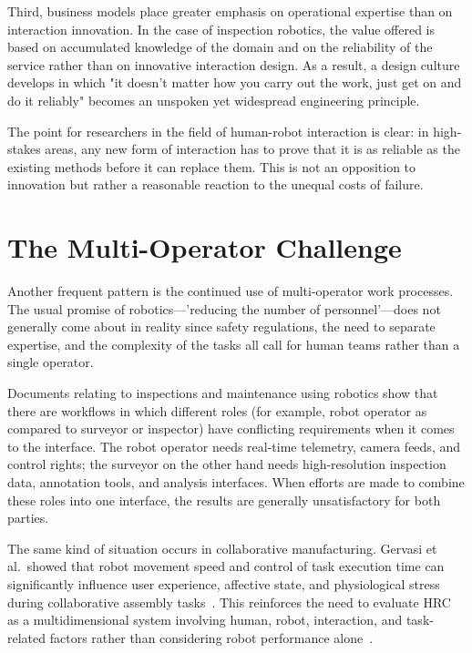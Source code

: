 \documentclass[sigconf, nonacm] {acmart}
\begin{document}
Third, business models place greater emphasis on operational expertise than on interaction innovation. In the case of inspection robotics, the value offered is based on accumulated knowledge of the domain and on the reliability of the service rather than on innovative interaction design. As a result, a design culture develops in which "it doesn't matter how you carry out the work, just get on and do it reliably" becomes an unspoken yet widespread engineering principle.

The point for researchers in the field of human-robot interaction is clear: in high-stakes areas, any new form of interaction has to prove that it is as reliable as the existing methods before it can replace them. This is not an opposition to innovation but rather a reasonable reaction to the unequal costs of failure.




\section{The Multi-Operator Challenge}
Another frequent pattern is the continued use of multi-operator work processes. The usual promise of robotics—'reducing the number of personnel'—does not generally come about in reality since safety regulations, the need to separate expertise, and the complexity of the tasks all call for human teams rather than a single operator.

Documents relating to inspections and maintenance using robotics show that there are workflows in which different roles (for example, robot operator as compared to surveyor or inspector) have conflicting requirements when it comes to the interface. The robot operator needs real-time telemetry, camera feeds, and control rights; the surveyor on the other hand needs high-resolution inspection data, annotation tools, and analysis interfaces. When efforts are made to combine these roles into one interface, the results are generally unsatisfactory for both parties.

The same kind of situation occurs in collaborative manufacturing. Gervasi et al.\ showed that robot movement speed and control of task execution time can significantly influence user experience, affective state, and physiological stress during collaborative assembly tasks~\cite{Gervasi2022}. This reinforces the need to evaluate HRC as a multidimensional system involving human, robot, interaction, and task-related factors rather than considering robot performance alone~\cite{Gervasi2020}.
\end{document}

